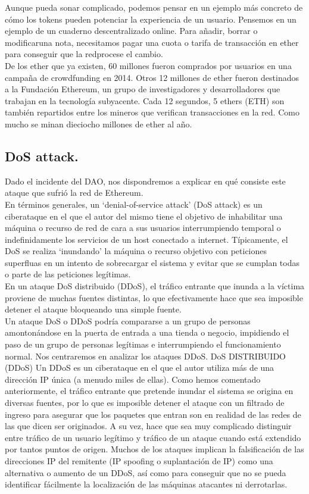 \documentclass[11pt,a4paper]{article}
\begin{document}
Aunque pueda sonar complicado, podemos pensar en un ejemplo más concreto de cómo los tokens pueden potenciar la experiencia de un usuario. Pensemos en un ejemplo de un cuaderno descentralizado online. Para añadir, borrar o modificaruna nota, necesitamos pagar una cuota o tarifa de transacción en ether para conseguir que la redprocese el cambio.\\

De los ether que ya existen, 60 millones fueron comprados por usuarios en una campaña de
crowdfunding en 2014. Otros 12 millones de ether fueron destinados a la Fundación Ethereum, un grupo de investigadores y desarrolladores que trabajan en la tecnología subyacente. Cada 12 segundos, 5 ethers (ETH) son también repartidos entre los mineros que verifican transacciones en la red. Como mucho se minan dieciocho millones de ether al año.\\


\subsection{DoS attack.}
Dado el incidente del DAO, nos dispondremos a explicar en qué consiste este ataque que sufrió la red de Ethereum.\\

En términos generales, un ‘denial-of-service attack’ (DoS attack) es un ciberataque en el que el autor del mismo tiene el objetivo de inhabilitar una máquina o recurso de red de cara a sus usuarios interrumpiendo temporal o indefinidamente los servicios de un host conectado a internet. Típicamente, el DoS se realiza ‘inundando’ la máquina o recurso objetivo con peticiones superfluas en un intento de sobrecargar el sistema y evitar que se cumplan todas o parte de las peticiones legítimas.\\

En un ataque DoS distribuido (DDoS), el tráfico entrante que inunda a la víctima proviene de muchas fuentes distintas, lo que efectivamente hace que sea imposible detener el ataque bloqueando una simple fuente.\\

Un ataque DoS o DDoS podría compararse a un grupo de personas amontonándose en la puerta de entrada a una tienda o negocio, impidiendo el paso de un grupo de personas legítimas e interrumpiendo el funcionamiento normal. Nos centraremos en analizar los ataques DDoS. DoS DISTRIBUIDO (DDoS) Un DDoS es un ciberataque en el que el autor utiliza más de una dirección IP única (a menudo miles de ellas). Como hemos comentado anteriormente, el tráfico entrante que pretende inundar el sistema se origina en diversas fuentes, por lo que es imposible detener el ataque con un filtrado de ingreso para asegurar que los paquetes que entran son en realidad de las redes de las que dicen ser originados. A su vez, hace que sea muy complicado distinguir entre tráfico de un usuario legítimo y tráfico de un ataque cuando está extendido por tantos puntos de origen. Muchos de los ataques implican la falsificación de las direcciones IP del remitente (IP spoofing o suplantación de IP) como una alternativa o aumento de un DDoS, así como para conseguir que no se pueda identificar fácilmente la localización de las máquinas atacantes ni derrotarlas.
\end{document}

